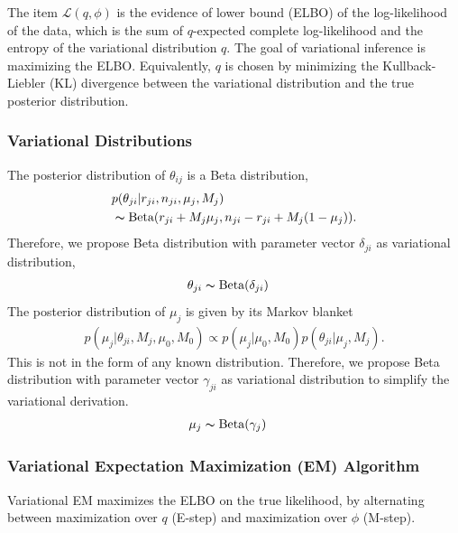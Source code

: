 \documentclass{article}
\begin{document}
The item $\mathcal{L}(q, \phi)$ is the evidence of lower bound (ELBO) of the log-likelihood of the data, which is the sum of $q$-expected complete log-likelihood and the entropy of the variational distribution $q$.
The goal of variational inference is maximizing the ELBO.
Equivalently, $q$ is chosen by minimizing the Kullback-Liebler (KL) divergence between the variational distribution and the true posterior distribution.

\subsubsection{Variational Distributions}
The posterior distribution of $\theta_{ij}$ is a Beta distribution,
\begin{align}
&p(\theta_{ji}|r_{ji},n_{ji},\mu_j,M_j)\\
&\thicksim \text{Beta}(r_{ji}+M_j \mu_j, n_{ji}-r_{ji}+M_j(1-\mu_j)).
\end{align}
Therefore, we propose Beta distribution with parameter vector $\delta_{ji}$ as variational distribution,
\begin{align}
\theta_{ji} &\thicksim \text{Beta}(\delta_{ji}) \nonumber
\end{align}
%
The posterior distribution of $\mu_j$ is given by its Markov blanket
\begin{align}
p(\mu_j|\theta_{ji},M_j,\mu_0,M_0)\propto p(\mu_j|\mu_0,M_0)p(\theta_{ji}|\mu_j,M_j).
\end{align}
This is not in the form of any known distribution. Therefore, we propose Beta distribution with parameter vector $\gamma_{ji}$ as variational distribution to simplify the variational derivation.
\begin{align}
\mu_j &\thicksim \text{Beta}(\gamma_j) \nonumber
\end{align}

\subsubsection{Variational Expectation Maximization (EM) Algorithm}
Variational EM maximizes the ELBO on the true likelihood, by alternating between maximization over $q$ (E-step) and maximization over $\phi$ (M-step).
\end{document}
